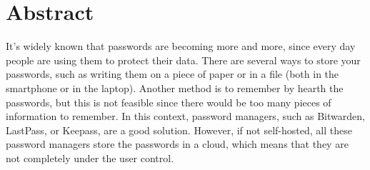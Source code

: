 \chapter*{Abstract}

It's widely known that passwords are becoming more and more, since every day people are using them to protect their data. There are several ways to store your passwords, such as writing them on a piece of paper or in a file (both in the smartphone or in the laptop). Another method is to remember by hearth the passwords, but this is not feasible since there would be too many pieces of information to remember. In this context, password managers, such as Bitwarden, LastPass, or Keepass, are a good solution. However, if not self-hosted, all these password managers store the passwords in a cloud, which means that they are not completely under the user control. 

